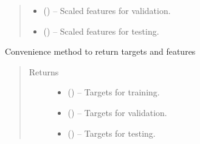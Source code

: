 \documentclass[a4paper,10pt,english]{sphinxmanual}
\begin{document}
\begin{fulllineitems}
\begin{fulllineitems}
\begin{quote}
\begin{description}
\begin{itemize}
\item {} 
 () -- Scaled features for validation.

\item {} 
 () -- Scaled features for testing.

\end{itemize}


\end{description}\end{quote}

\end{fulllineitems}


\begin{fulllineitems}
\label{\detokenize{api/ucf.TrainingDataSets:ucf.TrainingDataSets.get_targets}}
Convenience method to return targets and features
\begin{quote}\begin{description}
\item[{Returns}] \leavevmode
\begin{itemize}
\item {} 
 () -- Targets for training.

\item {} 
 () -- Targets for validation.

\item {} 
 () -- Targets for testing.

\end{itemize}


\end{description}\end{quote}

\end{fulllineitems}



\end{fulllineitems}
\end{document}
